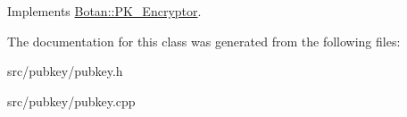 Implements \hyperlink{classBotan_1_1PK__Encryptor_a211f9f20b0812657fcaf7a60b991d650}{Botan\-::\-P\-K\-\_\-\-Encryptor}.



The documentation for this class was generated from the following files\-:\begin{DoxyCompactItemize}
\item 
src/pubkey/pubkey.\-h\item 
src/pubkey/pubkey.\-cpp\end{DoxyCompactItemize}
